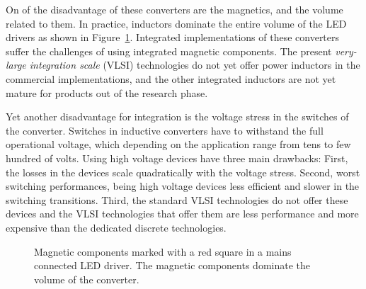 On of the disadvantage of these converters are the magnetics, and the volume related to them. In practice, inductors dominate the entire volume of the LED drivers as shown in Figure~\ref{fig:smps_driver}. Integrated implementations of these converters suffer the challenges of using integrated magnetic components. The present \emph{very-large integration scale} (VLSI) technologies do not yet offer power inductors in the commercial implementations, and the other integrated inductors are not yet mature for products out of the research phase.

Yet another disadvantage for integration is the voltage stress in the switches of the converter. Switches in inductive converters have to withstand the full operational voltage, which depending on the application range from tens to few hundred of volts. Using high voltage devices have three main drawbacks: First, the losses in the devices scale quadratically with the voltage  stress. Second, worst switching performances, being high voltage devices less efficient and slower in the switching transitions. Third, the standard VLSI technologies do not offer these devices and the VLSI technologies that offer them are less performance and more expensive than the dedicated discrete technologies.

\begin{figure}[!h]
\centering
{}
\caption{Magnetic components marked with a red square in a mains connected LED driver. The magnetic components dominate the volume of the converter.}
\label{fig:smps_driver}
\end{figure}


